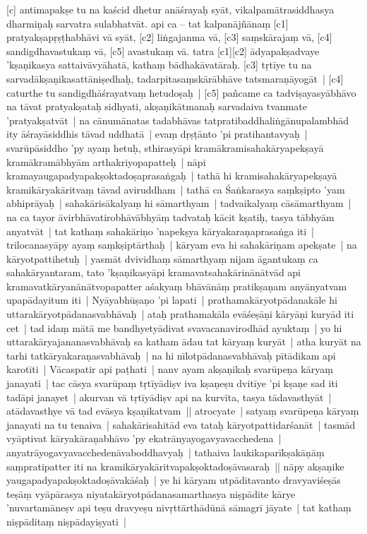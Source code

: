 \documentclass[article,12pt,a4paper]{memoir}%
\newcommand{\persName}[1]{#1}
\begin{document}
\label{thakur75-85.8} [c] antimapakṣe tu na kaścid dhetur anāśrayaḥ syāt, vikalpamātrasiddhasya dharmiṇaḥ sarvatra sulabhatvāt. \label{thakur75-85.10} api ca – tat kalpanājñānaṃ [c1] pratyakṣapṛṣṭhabhāvi vā syāt, [c2] liṅgajanma vā, [c3] saṃskārajaṃ vā, [c4] sandigdhavastukaṃ vā, [c5] avastukaṃ vā. \label{thakur75-85.12} tatra [c1][c2] ādyapakṣadvaye 'kṣaṇikasya sattaivāvyāhatā, kathaṃ bādhakāvatāraḥ. \label{thakur75-85.12a} [c3] tṛtīye tu na sarvadākṣaṇikasattāniṣedhaḥ, tadarpitasaṃskārābhāve tatsmaraṇāyogāt | \label{thakur75-85.13} [c4] caturthe tu sandigdhāśrayatvaṃ hetudoṣaḥ | \label{thakur75-85.14} [c5] pañcame ca tadviṣayasyābhāvo na tāvat pratyakṣataḥ sidhyati, akṣaṇikātmanaḥ sarvadaiva tvanmate 'pratyakṣatvāt | na cānumānatas tadabhāvas tatpratibaddhaliṅgānupalambhād ity āśrayāsiddhis tāvad uddhatā | evaṃ dṛṣṭānto 'pi pratihantavyaḥ | \label{thakur75-85.18} svarūpāsiddho 'py ayaṃ hetuḥ, sthirasyāpi kramākramisahakāryapekṣayā kramākramābhyām arthakriyopapatteḥ | nāpi kramayaugapadyapakṣoktadoṣaprasaṅgaḥ | tathā hi kramisahakāryapekṣayā kramikāryakāritvaṃ tāvad aviruddham | \label{thakur75-85.21} tathā ca Śaṅkarasya saṃkṣipto 'yam abhiprāyaḥ | sahakārisākalyaṃ hi sāmarthyam | tadvaikalyaṃ cāsāmarthyam | na ca tayor āvirbhāvatirobhāvābhyāṃ tadvataḥ kācit kṣatiḥ, tasya tābhyām anyatvāt | tat kathaṃ sahakāriṇo 'napekṣya kāryakaraṇaprasaṅga iti | \label{thakur75-85.25} \persName{trilocanasyā}py ayaṃ saṃkṣiptārthaḥ | kāryam eva hi sahakāriṇam apekṣate | na kāryotpattihetuḥ | yasmāt dvividhaṃ sāmarthyaṃ nijam āgantukaṃ ca sahakāryantaram, tato 'kṣaṇikasyāpi kramavatsahakārinānātvād api kramavatkāryanānātvopapatter aśakyaṃ bhāvānāṃ pratikṣaṇam anyānyatvam upapādayitum iti | \label{thakur75-85.29} Nyāyabhūṣaṇo 'pi lapati | prathamakāryotpādanakāle hi uttarakāryotpādanasvabhāvaḥ | ataḥ prathamakāla evāśeṣāṇi kāryāṇi kuryād iti cet | \label{thakur75-85.30} tad idaṃ mātā me bandhyetyādivat svavacanavirodhād ayuktaṃ | yo hi uttarakāryajananasvabhāvaḥ sa katham ādau tat kāryaṃ kuryāt | atha kuryāt na tarhi tatkāryakaraṇasvabhāvaḥ | na hi nīlotpādanasvabhāvaḥ pītādikam api karotīti | \label{thakur75-86.3} Vācaspatir api paṭhati | nanv ayam akṣaṇikaḥ svarūpeṇa kāryaṃ janayati | tac cāsya svarūpaṃ tṛtīyādiṣv iva kṣaṇeṣu dvitīye 'pi kṣaṇe sad iti tadāpi janayet | akurvan vā tṛtīyādiṣv api na kurvīta, tasya tādavasthyāt | atādavasthye vā tad evāsya kṣaṇikatvam || \label{thakur75-86.7} atrocyate | satyaṃ svarūpeṇa kāryaṃ janayati na tu tenaiva | sahakārisahitād eva tataḥ kāryotpattidarśanāt | tasmād vyāptivat kāryakāraṇabhāvo 'py ekatrānyayogavyavacchedena | anyatrāyogavyavacchedenāvaboddhavyaḥ | tathaiva laukikaparīkṣakāṇāṃ saṃpratipatter iti na kramikāryakāritvapakṣoktadoṣāvasaraḥ || \label{thakur75-86.11} nāpy akṣaṇike yaugapadyapakṣoktadoṣāvakāśaḥ | ye hi kāryam utpāditavanto dravyaviśeṣās teṣāṃ vyāpārasya niyatakāryotpādanasamarthasya niṣpādite kārye 'nuvartamāneṣv api teṣu dravyeṣu nivṛttārthādūnā sāmagrī jāyate | tat kathaṃ niṣpāditaṃ niṣpādayiṣyati | 
\end{document}
